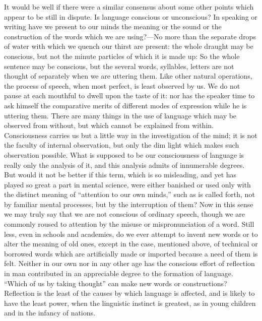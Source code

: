 \documentclass[11pt,letter]{article}
\begin{document}
\par  It would be well if there were a similar consensus about some other points which appear to be still in dispute. Is language conscious or unconscious? In speaking or writing have we present to our minds the meaning or the sound or the construction of the words which we are using?—No more than the separate drops of water with which we quench our thirst are present: the whole draught may be conscious, but not the minute particles of which it is made up: So the whole sentence may be conscious, but the several words, syllables, letters are not thought of separately when we are uttering them. Like other natural operations, the process of speech, when most perfect, is least observed by us. We do not pause at each mouthful to dwell upon the taste of it: nor has the speaker time to ask himself the comparative merits of different modes of expression while he is uttering them. There are many things in the use of language which may be observed from without, but which cannot be explained from within. Consciousness carries us but a little way in the investigation of the mind; it is not the faculty of internal observation, but only the dim light which makes such observation possible. What is supposed to be our consciousness of language is really only the analysis of it, and this analysis admits of innumerable degrees. But would it not be better if this term, which is so misleading, and yet has played so great a part in mental science, were either banished or used only with the distinct meaning of “attention to our own minds,” such as is called forth, not by familiar mental processes, but by the interruption of them? Now in this sense we may truly say that we are not conscious of ordinary speech, though we are commonly roused to attention by the misuse or mispronunciation of a word. Still less, even in schools and academies, do we ever attempt to invent new words or to alter the meaning of old ones, except in the case, mentioned above, of technical or borrowed words which are artificially made or imported because a need of them is felt. Neither in our own nor in any other age has the conscious effort of reflection in man contributed in an appreciable degree to the formation of language. “Which of us by taking thought” can make new words or constructions? Reflection is the least of the causes by which language is affected, and is likely to have the least power, when the linguistic instinct is greatest, as in young children and in the infancy of nations.
\end{document}
